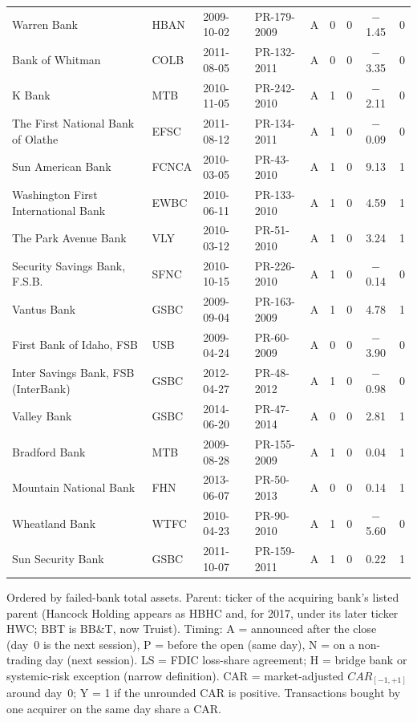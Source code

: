 \begin{table}[!t]
\begin{tabular*}{\textwidth}{@{\extracolsep{\fill}}llllccccc}
Warren Bank & HBAN & 2009-10-02 & PR-179-2009 & A & 0 & 0 & $-$1.45 & 0 \\
Bank of Whitman & COLB & 2011-08-05 & PR-132-2011 & A & 0 & 0 & $-$3.35 & 0 \\
K Bank & MTB & 2010-11-05 & PR-242-2010 & A & 1 & 0 & $-$2.11 & 0 \\
The First National Bank of Olathe & EFSC & 2011-08-12 & PR-134-2011 & A & 1 & 0 & $-$0.09 & 0 \\
Sun American Bank & FCNCA & 2010-03-05 & PR-43-2010 & A & 1 & 0 & 9.13 & 1 \\
Washington First International Bank & EWBC & 2010-06-11 & PR-133-2010 & A & 1 & 0 & 4.59 & 1 \\
The Park Avenue Bank & VLY & 2010-03-12 & PR-51-2010 & A & 1 & 0 & 3.24 & 1 \\
Security Savings Bank, F.S.B. & SFNC & 2010-10-15 & PR-226-2010 & A & 1 & 0 & $-$0.14 & 0 \\
Vantus Bank & GSBC & 2009-09-04 & PR-163-2009 & A & 1 & 0 & 4.78 & 1 \\
First Bank of Idaho, FSB & USB & 2009-04-24 & PR-60-2009 & A & 0 & 0 & $-$3.90 & 0 \\
Inter Savings Bank, FSB (InterBank) & GSBC & 2012-04-27 & PR-48-2012 & A & 1 & 0 & $-$0.98 & 0 \\
Valley Bank & GSBC & 2014-06-20 & PR-47-2014 & A & 0 & 0 & 2.81 & 1 \\
Bradford Bank & MTB & 2009-08-28 & PR-155-2009 & A & 1 & 0 & 0.04 & 1 \\
Mountain National Bank & FHN & 2013-06-07 & PR-50-2013 & A & 0 & 0 & 0.14 & 1 \\
Wheatland Bank & WTFC & 2010-04-23 & PR-90-2010 & A & 1 & 0 & $-$5.60 & 0 \\
Sun Security Bank & GSBC & 2011-10-07 & PR-159-2011 & A & 1 & 0 & 0.22 & 1 \\
\bottomrule
\end{tabular*}
\par\vspace{2pt}\parbox{0.96\textwidth}{\scriptsize Ordered by failed-bank total assets. Parent: ticker of the acquiring bank's listed parent (Hancock
Holding appears as HBHC and, for 2017, under its later ticker HWC; BBT is BB\&T, now Truist). Timing: A = announced after the
close (day~0 is the next session), P = before the open (same day), N = on a non-trading day (next session).
LS = FDIC loss-share agreement; H = bridge bank or systemic-risk exception (narrow definition). CAR = market-adjusted
$CAR_{[-1,+1]}$ around day~0; Y = 1 if the unrounded CAR is positive. Transactions bought by one acquirer on the same day share a CAR.}
\end{table}
